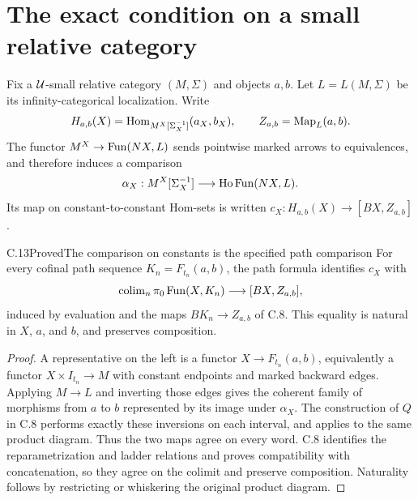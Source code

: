 \section{The exact condition on a small relative category}

Fix a $\mathcal U$-small relative category $(M,\Sigma)$ and objects $a,b$. Let $L=L(M,\Sigma)$ be its infinity-categorical localization. Write
\[
 H_{a,b}(X)=\operatorname{Hom}_{M^X[\Sigma_X^{-1}]}(a_X,b_X),\qquad
 Z_{a,b}=\operatorname{Map}_L(a,b).
\]
The functor $M^X\to\operatorname{Fun}(NX,L)$ sends pointwise marked arrows to equivalences, and therefore induces a comparison
\[
 \alpha_X:M^X[\Sigma_X^{-1}]\longrightarrow\operatorname{Ho}\operatorname{Fun}(NX,L).
\]
Its map on constant-to-constant Hom-sets is written
$c_X:H_{a,b}(X)\to[BX,Z_{a,b}]$.

\begin{claim}{C.13}{Proved}{The comparison on constants is the specified path comparison}
For every cofinal path sequence $K_n=F_{t_n}(a,b)$, the path formula identifies $c_X$ with
\[
 \operatorname{colim}_n\pi_0\operatorname{Fun}(X,K_n)
 \longrightarrow[BX,Z_{a,b}],
\]
induced by evaluation and the maps $BK_n\to Z_{a,b}$ of C.8. This equality is natural in $X$, $a$, and $b$, and preserves composition.
\end{claim}
\begin{proof}
A representative on the left is a functor $X\to F_{t_n}(a,b)$, equivalently a functor $X\times I_{t_n}\to M$ with constant endpoints and marked backward edges. Applying $M\to L$ and inverting those edges gives the coherent family of morphisms from $a$ to $b$ represented by its image under $\alpha_X$. The construction of $Q$ in C.8 performs exactly these inversions on each interval, and applies to the same product diagram. Thus the two maps agree on every word. C.8 identifies the reparametrization and ladder relations and proves compatibility with concatenation, so they agree on the colimit and preserve composition. Naturality follows by restricting or whiskering the original product diagram.
\end{proof}

